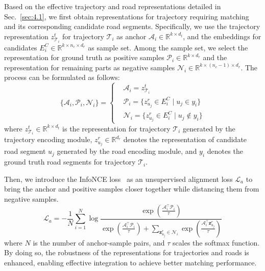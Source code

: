 Based on the effective trajectory and road representations detailed in Sec.~\ref{sec:4.1}, we first obtain representations for trajectory requiring matching and its corresponding candidate road segments. Specifically, we use the trajectory representation $z_{\mathcal{T}_i}^t$ for trajectory $\mathcal{T}_i$ as anchor $\mathcal{A}_{i} \in \mathbb{R}^{k \times d_t}$, and the embeddings for candidates $E_i^C \in \mathbb{R}^{k \times n_c \times d_r}$ as sample set. Among the sample set, we select the representation for ground truth as positive samples $\mathcal{P}_{i} \in \mathbb{R}^{k \times d_r}$ and the representation for remaining parts as negative samples $\mathcal{N}_{i} \in \mathbb{R}^{k \times (n_c-1) \times d_r}$. The process can be formulated as follows:
\begin{equation}
    \{\mathcal{A}_{i}, \mathcal{P}_{i}, \mathcal{N}_{i}\} = \left\{
    \begin{aligned}
        &\mathcal{A}_{i} = z_{\mathcal{T}_i}^t \\
        &\mathcal{P}_{i} = \{z_{u_j}^r \in E_i^C \mid u_j \in y_{i}\} \\
        &\mathcal{N}_{i} = \{z_{u_j}^r \in E_i^C \mid u_j \notin y_{i}\}
    \end{aligned}
    \right.
\end{equation}
where $z_{\mathcal{T}_i}^t \in \mathbb{R}^{k \times d_t}$ is the representation for trajectory $\mathcal{T}_i$ generated by the trajectory encoding module, $z_{u_j}^r \in \mathbb{R}^{d_r}$ denotes the representation of candidate road segment $u_j$ generated by the road encoding module, and $y_{i}$ denotes the ground truth road segments for trajectory $\mathcal{T}_i$.

Then, we introduce the InfoNCE loss~\cite{infonce} as an unsupervised alignment loss $\mathcal{L}_a$ to bring the anchor and positive samples closer together while distancing them from negative samples.
\begin{equation}
\mathcal{L}_a = -\frac{1}{N} \sum_{i=1}^{N} \log \frac{\exp\left(\frac{\mathcal{A}_i^\top \mathcal{P}_i}{\tau}\right)}{\exp\left(\frac{\mathcal{A}_i^\top \mathcal{P}_i}{\tau}\right) + \sum_{\mathbf{z}_{u_j}^r \in \mathcal{N}_i} \exp\left(\frac{\mathcal{A}_i^\top \mathbf{z}_{u_j}^r}{\tau}\right)}
\end{equation}
where $N$ is the number of anchor-sample pairs, and $\tau$ scales the softmax function. By doing so, the robustness of the representations for trajectories and roads is enhanced, enabling effective integration to achieve better matching performance.

